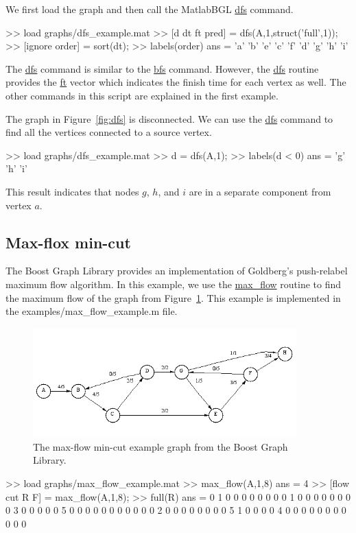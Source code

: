 \documentclass[12pt]{article}
\newcommand{\mycmd}[1]{\url{#1}}
\newcommand{\mypath}[1]{{\ttfamily \small #1}}
\begin{document}
We first load the graph and then call the MatlabBGL \mycmd{dfs} command.  
\begin{mcode}
>> load graphs/dfs_example.mat
>> [d dt ft pred] = dfs(A,1,struct('full',1));
>> [ignore order] = sort(dt);
>> labels(order)
ans = 
    'a'
    'b'
    'e'
    'c'
    'f'
    'd'
    'g'
    'h'
    'i'
\end{mcode}

The \mycmd{dfs} command is similar to the \mycmd{bfs} command.  However, the \mycmd{dfs} routine provides the \mycmd{ft} vector which indicates the finish time for each vertex as well.  The other commands in this script are explained in the first example. 

The graph in Figure~\ref{fig:dfs} is disconnected.  We can use the \mycmd{dfs} command to find all the vertices connected to a source vertex.  

\begin{mcode}
>> load graphs/dfs_example.mat
>> d = dfs(A,1);
>> labels(d < 0)
ans = 
    'g'
    'h'
    'i'
\end{mcode}

This result indicates that nodes $g$, $h$, and $i$ are in a separate component from vertex $a$.  

\subsection{Max-flox min-cut}
The Boost Graph Library provides an implementation of Goldberg's push-relabel maximum flow algorithm.  In this example, we use the \mycmd{max_flow} routine to find the maximum flow of the graph from Figure~\ref{fig:mincut}.  This example is implemented in the \mypath{examples/max\_flow\_example.m} file.  

\begin{figure}[ht!]
\centering
\includegraphics[width=4in]{max-flow}
\caption{The max-flow min-cut example graph from the Boost Graph Library.}
\label{fig:mincut}
\end{figure}

\begin{mcode}
>> load graphs/max_flow_example.mat
>> max_flow(A,1,8)
ans =
     4
>> [flow cut R F] = max_flow(A,1,8);
>> full(R)     
ans =
     0     1     0     0     0     0     0     0
     0     0     1     0     0     0     0     0
     0     0     0     3     0     0     0     0
     0     5     0     0     0     0     0     0
     0     0     0     0     0     2     0     0
     0     0     0     0     0     0     5     1
     0     0     0     0     4     0     0     0
     0     0     0     0     0     0     0     0
\end{mcode}
\end{document}
